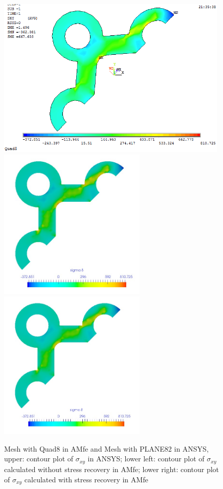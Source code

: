 \begin{figure}[htbp]
	\begin{center}
		\includegraphics[width=11cm,clip]{Quad8_Sxy.png} 
		\includegraphics[width=7cm,clip]{Quad8_Sxy_PD.png} 		
		\includegraphics[width=7cm,clip]{Quad8_Sxy_P.png} 		
		\caption{Mesh with Quad8 in AMfe and Mesh with PLANE82 in ANSYS, upper: contour plot of $\sigma_{xy}$ in ANSYS; lower left: contour plot of $\sigma_{xy}$ calculated without stress recovery in AMfe; lower right: contour plot of $\sigma_{xy}$ calculated with stress recovery in AMfe} \label{fig: Quad8_Sxy}
	\end{center}
\end{figure}
\clearpage 

